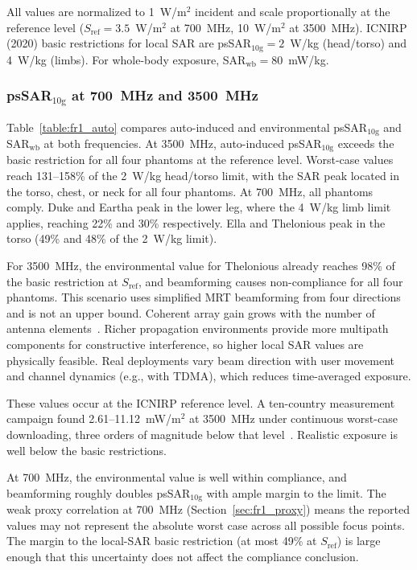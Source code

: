 \documentclass{iopjournal}
\begin{document}
All values are normalized to 1~W/m$^2$ incident and scale proportionally at the reference level ($S_\mathrm{ref} = 3.5$~W/m$^2$ at 700~MHz, 10~W/m$^2$ at 3500~MHz).
ICNIRP (2020) basic restrictions for local SAR are psSAR$_{10\mathrm{g}} = 2$~W/kg (head/torso) and 4~W/kg (limbs). For whole-body exposure, SAR$_\mathrm{wb} = 80$~mW/kg.

\subsubsection{psSAR$_{10\mathrm{g}}$ at 700~MHz and 3500~MHz}

Table~\ref{table:fr1_auto} compares auto-induced and environmental psSAR$_{10\mathrm{g}}$ and SAR$_\mathrm{wb}$ at both frequencies.
At 3500~MHz, auto-induced psSAR$_{10\mathrm{g}}$ exceeds the basic restriction for all four phantoms at the reference level.
Worst-case values reach 131--158\% of the 2~W/kg head/torso limit, with the SAR peak located in the torso, chest, or neck for all four phantoms.
At 700~MHz, all phantoms comply.
Duke and Eartha peak in the lower leg, where the 4~W/kg limb limit applies, reaching 22\% and 30\% respectively.
Ella and Thelonious peak in the torso (49\% and 48\% of the 2~W/kg limit).

For 3500~MHz, the environmental value for Thelonious already reaches 98\% of the basic restriction at $S_\mathrm{ref}$, and beamforming causes non-compliance for all four phantoms.
This scenario uses simplified \gls{MRT} beamforming from four directions and is not an upper bound.
Coherent array gain grows with the number of antenna elements~\citep{marzetta2016fundamentals}.
Richer propagation environments provide more multipath components for constructive interference, so higher local SAR values are physically feasible.
Real deployments vary beam direction with user movement and channel dynamics (e.g., with \gls{TDMA}), which reduces time-averaged exposure.

These values occur at the \gls{ICNIRP} reference level.
A ten-country measurement campaign found 2.61--11.12~mW/m$^2$ at 3500~MHz under continuous worst-case downloading, three orders of magnitude below that level~\citep{veludo2025assessing}.
Realistic exposure is well below the basic restrictions.

At 700~MHz, the environmental value is well within compliance, and beamforming roughly doubles psSAR$_{10\mathrm{g}}$ with ample margin to the limit.
The weak proxy correlation at 700~MHz (Section~\ref{sec:fr1_proxy}) means the reported values may not represent the absolute worst case across all possible focus points.
The margin to the local-SAR basic restriction (at most 49\% at $S_\mathrm{ref}$) is large enough that this uncertainty does not affect the compliance conclusion.
\end{document}

